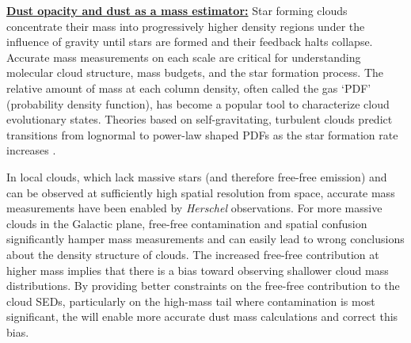 \documentclass[11pt,preprint]{aastex_nofoot}
\begin{document}
\indent\underline{\textbf{\helv Dust opacity and dust as a mass estimator:}} 
Star forming clouds concentrate their mass into progressively higher density
regions under the influence of gravity until stars are formed and their
feedback halts collapse. Accurate mass measurements on each scale are critical for understanding molecular cloud
structure, mass budgets, and the star formation process.  
The relative amount of mass at each column density, often called the gas `PDF'
(probability density function), has become a popular tool to characterize cloud
evolutionary states.  Theories based on self-gravitating, turbulent clouds
predict transitions from lognormal to power-law shaped PDFs as the star
formation rate increases \citep[e.g.,][]{Federrath2015c,Burkhart2018a}.


In local clouds, which lack massive stars (and therefore free-free emission)
and can be observed at sufficiently high spatial resolution from space,
accurate mass measurements have been enabled by \textit{Herschel} observations.  For
more massive clouds in the Galactic plane, free-free contamination and spatial
confusion significantly hamper mass measurements and can easily lead to wrong
conclusions about the density structure of clouds.  The increased free-free
contribution at higher mass implies that there is 
a bias toward observing shallower cloud mass distributions.
By providing better constraints on the free-free contribution to the cloud
SEDs,  particularly on the high-mass tail where contamination is most
significant, the \MGPS will enable more accurate dust mass calculations and
correct this bias.

\end{document}

